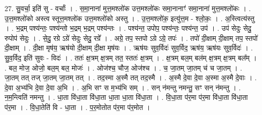 \documentclass[17pt]{extarticle}
\begin{document}
27. सु॒वर्चा॒ इति॑ सु - वर्चाः᳚ । . स॒मा॒नाना॑ मुत्त॒मश्लो॑क उत्त॒मश्लो॑कः समा॒नानाꣳ॑ समा॒नाना॑ मुत्त॒मश्लो॑कः । . उ॒त्त॒मश्लो॑को अस्त्व स्तूत्त॒मश्लो॑क उत्त॒मश्लो॑को अस्तु । . उ॒त्त॒मश्लो॑क॒ इत्यु॑त्त॒म - श्लो॒कः॒ । . अ॒स्त्वित्य॑स्तु । . भ॒द्रम् पश्य॑न्तः॒ पश्य॑न्तो भ॒द्रम् भ॒द्रम् पश्य॑न्तः । . पश्य॑न्त॒ उपोप॒ पश्य॑न्तः॒ पश्य॑न्त॒ उप॑ । . उप॑ सेदुः सेदु॒ रुपोप॑ सेदुः । . से॒दु॒ रग्रे ऽग्रे॑ सेदुः सेदु॒ रग्रे᳚ । . अग्रे॒ तप॒ स्तपो ऽग्रे ऽग्रे॒ तपः॑ । . तपो॑ दी॒क्षाम् दी॒क्षाम् तप॒ स्तपो॑ दी॒क्षाम् । . दी॒क्षा मृष॑य॒ ऋष॑यो दी॒क्षाम् दी॒क्षा मृष॑यः । . ऋष॑यः सुव॒र्विदः॑ सुव॒र्विद॒ ऋष॑य॒ ऋष॑यः सुव॒र्विदः॑ । . सु॒व॒र्विद॒ इति॑ सुवः - विदः॑ । . ततः॑ क्ष॒त्रम् क्ष॒त्रम् तत॒ स्ततः॑ क्ष॒त्रम् । . क्ष॒त्रम् बल॒म् बल॑म् क्ष॒त्रम् क्ष॒त्रम् बल᳚म् । . बल॒ मोज॒ ओजो॒ बल॒म् बल॒ मोजः॑ । . ओज॑श्च॒ चौज॒ ओज॑श्च । . च॒ जा॒तम् जा॒तम् च॑ च जा॒तम् । . जा॒तम् तत् तज् जा॒तम् जा॒तम् तत् । . तद॒स्मा अ॒स्मै तत् तद॒स्मै । . अ॒स्मै दे॒वा दे॒वा अ॒स्मा अ॒स्मै दे॒वाः । . दे॒वा अ॒भ्य॑भि दे॒वा दे॒वा अ॒भि । . अ॒भि सꣳ स म॒भ्य॑भि सम् । . सन् न॑मन्तु नमन्तु॒ सꣳ सन् न॑मन्तु । . न॒म॒न्त्विति॑ नमन्तु । . धा॒ता वि॑धा॒ता वि॑धा॒ता धा॒ता धा॒ता वि॑धा॒ता । . वि॒धा॒ता प॑र॒मा प॑र॒मा वि॑धा॒ता वि॑धा॒ता प॑र॒मा । . वि॒धा॒तेति॑ वि - धा॒ता । . प॒र॒मोतोत प॑र॒मा प॑र॒मोत । \newline
\end{document}
